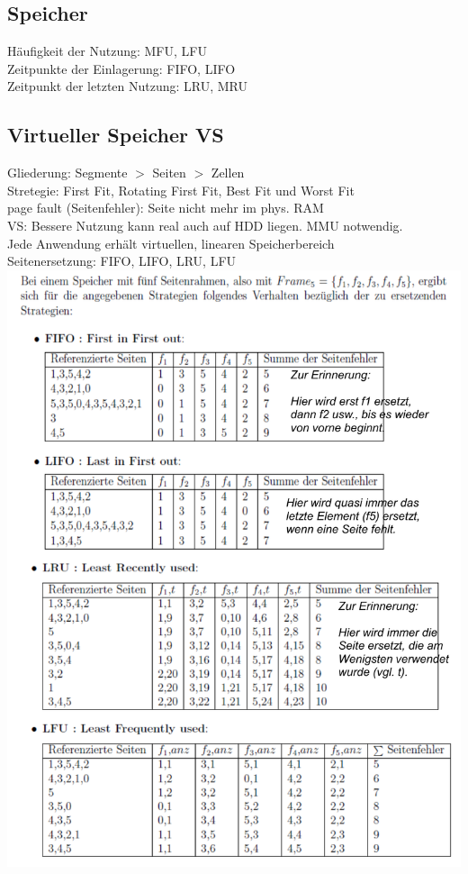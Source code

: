 \documentclass[fs]{latex4ei}
\begin{document}
\begin{multicols}{4}
\section{Speicher}
Häufigkeit der Nutzung: MFU, LFU\\
Zeitpunkte der Einlagerung: FIFO, LIFO\\
Zeitpunkt der letzten Nutzung: LRU, MRU\\

\subsection{Virtueller Speicher VS}
Gliederung: Segmente $>$ Seiten $>$ Zellen\\
Stretegie: First Fit, Rotating First Fit, Best Fit und Worst Fit\\
page fault (Seitenfehler): Seite nicht mehr im phys. RAM\\
VS: Bessere Nutzung kann real auch auf HDD liegen. MMU notwendig.\\
Jede Anwendung erhält virtuellen, linearen Speicherbereich\\
Seitenersetzung: FIFO, LIFO, LRU, LFU\\
\includegraphics[scale = 0.35]{./img/VSLIFO.pdf}



\end{multicols}
\end{document}

